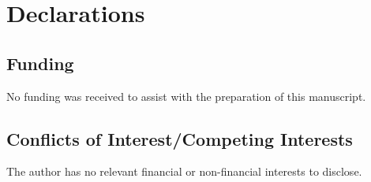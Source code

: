 \documentclass{article}
\theoremstyle{definition}
\numberwithin{equation}{section}
\begin{document}
\section*{Declarations}

\subsection*{Funding}

No funding was received to assist with the preparation of this manuscript.

\subsection*{Conflicts of Interest/Competing Interests}

The author has no relevant financial or non-financial interests to disclose.
\end{document}

